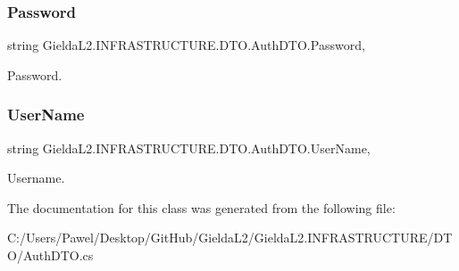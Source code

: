 \subsubsection{\texorpdfstring{Password}{Password}}
{\footnotesize\ttfamily string Gielda\+L2.\+I\+N\+F\+R\+A\+S\+T\+R\+U\+C\+T\+U\+R\+E.\+D\+T\+O.\+Auth\+D\+T\+O.\+Password\hspace{0.3cm}{\ttfamily [get]}, {\ttfamily [set]}}



Password. 

\mbox{\label{class_gielda_l2_1_1_i_n_f_r_a_s_t_r_u_c_t_u_r_e_1_1_d_t_o_1_1_auth_d_t_o_a34aca8e8a62a54635e0241833523a94a}} 
\subsubsection{\texorpdfstring{UserName}{UserName}}
{\footnotesize\ttfamily string Gielda\+L2.\+I\+N\+F\+R\+A\+S\+T\+R\+U\+C\+T\+U\+R\+E.\+D\+T\+O.\+Auth\+D\+T\+O.\+User\+Name\hspace{0.3cm}{\ttfamily [get]}, {\ttfamily [set]}}



Username. 



The documentation for this class was generated from the following file\+:\begin{DoxyCompactItemize}
\item 
C\+:/\+Users/\+Pawel/\+Desktop/\+Git\+Hub/\+Gielda\+L2/\+Gielda\+L2.\+I\+N\+F\+R\+A\+S\+T\+R\+U\+C\+T\+U\+R\+E/\+D\+T\+O/Auth\+D\+T\+O.\+cs\end{DoxyCompactItemize}
